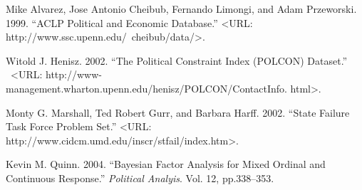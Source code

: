 \begin{Source}\relax
Mike Alvarez, Jose Antonio Cheibub, Fernando Limongi, and Adam
Przeworski. 1999. ``ACLP Political and Economic Database.'' <URL:
http://www.ssc.upenn.edu/~cheibub/data/>.

Witold J. Henisz. 2002. ``The Political Constraint Index (POLCON)
Dataset.'' \ <URL:
http://www-management.wharton.upenn.edu/henisz/POLCON/ContactInfo.
html>.

Monty G. Marshall, Ted Robert Gurr, and Barbara Harff. 2002.
``State Failure Task Force Problem Set.'' <URL:
http://www.cidcm.umd.edu/inscr/stfail/index.htm>.
\end{Source}
\begin{References}\relax
Kevin M. Quinn. 2004. ``Bayesian Factor Analysis for Mixed Ordinal
and Continuous Response.'' \emph{Political Analyis}. Vol. 12, pp.338--353.
\end{References}


